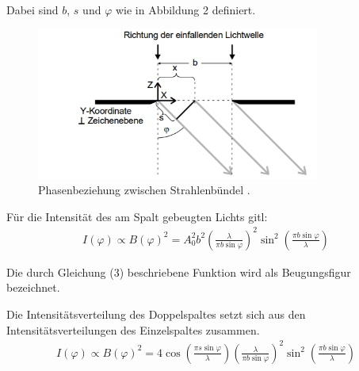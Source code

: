 Dabei sind $b$, $s$ und $\varphi$ wie in Abbildung 2 definiert.

\begin{figure}[H]
  \centering
  \includegraphics[height=5cm]{beugung.PNG}
  \caption{Phasenbeziehung zwischen Strahlenbündel \cite{sample}.}
  \label{fig:biegungbild1}
\end{figure}



Für die Intensität des am Spalt gebeugten Lichts gitl:
\begin{align}
  I(\varphi) \propto B(\varphi)^2 = A_0^2 b^2 \left(\frac{\lambda}{\pi b \sin{\varphi}} \right)^2  \sin^2{\left(\frac{\pi b \sin{\varphi}}{\lambda}\right)}
\end{align}

Die durch Gleichung (3) beschriebene Funktion wird als Beugungsfigur bezeichnet.

Die Intensitätsverteilung des Doppelspaltes setzt sich aus den Intensitätsverteilungen des Einzelspaltes zusammen.
\begin{align}
   I(\varphi) \propto B(\varphi)^2 = 4 \cos{\left(\frac{\pi s \sin{\varphi}}{\lambda}\right)} \left(\frac{\lambda}{\pi b \sin{\varphi}}\right)^2
   \sin^2{\left(\frac{\pi b \sin{\varphi}}{\lambda}\right)}
\end{align}
